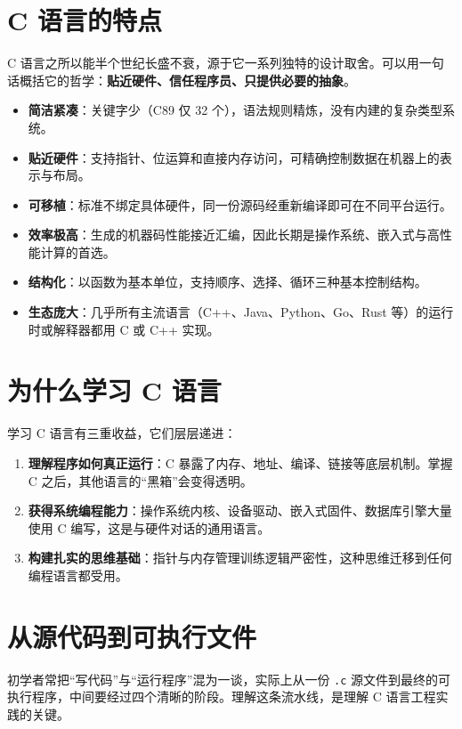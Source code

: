 \section{C 语言的特点}

C 语言之所以能半个世纪长盛不衰，源于它一系列独特的设计取舍。可以用一句话概括它的哲学：\textbf{贴近硬件、信任程序员、只提供必要的抽象}。

\begin{itemize}
    \item \textbf{简洁紧凑}：关键字少（C89 仅 32 个），语法规则精炼，没有内建的复杂类型系统。
    \item \textbf{贴近硬件}：支持指针、位运算和直接内存访问，可精确控制数据在机器上的表示与布局。
    \item \textbf{可移植}：标准不绑定具体硬件，同一份源码经重新编译即可在不同平台运行。
    \item \textbf{效率极高}：生成的机器码性能接近汇编，因此长期是操作系统、嵌入式与高性能计算的首选。
    \item \textbf{结构化}：以函数为基本单位，支持顺序、选择、循环三种基本控制结构。
    \item \textbf{生态庞大}：几乎所有主流语言（C++、Java、Python、Go、Rust 等）的运行时或解释器都用 C 或 C++ 实现。
\end{itemize}

\section{为什么学习 C 语言}

学习 C 语言有三重收益，它们层层递进：

\begin{enumerate}
    \item \textbf{理解程序如何真正运行}：C 暴露了内存、地址、编译、链接等底层机制。掌握 C 之后，其他语言的“黑箱”会变得透明。
    \item \textbf{获得系统编程能力}：操作系统内核、设备驱动、嵌入式固件、数据库引擎大量使用 C 编写，这是与硬件对话的通用语言。
    \item \textbf{构建扎实的思维基础}：指针与内存管理训练逻辑严密性，这种思维迁移到任何编程语言都受用。
\end{enumerate}

\section{从源代码到可执行文件}

初学者常把“写代码”与“运行程序”混为一谈，实际上从一份 \texttt{.c} 源文件到最终的可执行程序，中间要经过四个清晰的阶段。理解这条流水线，是理解 C 语言工程实践的关键。

